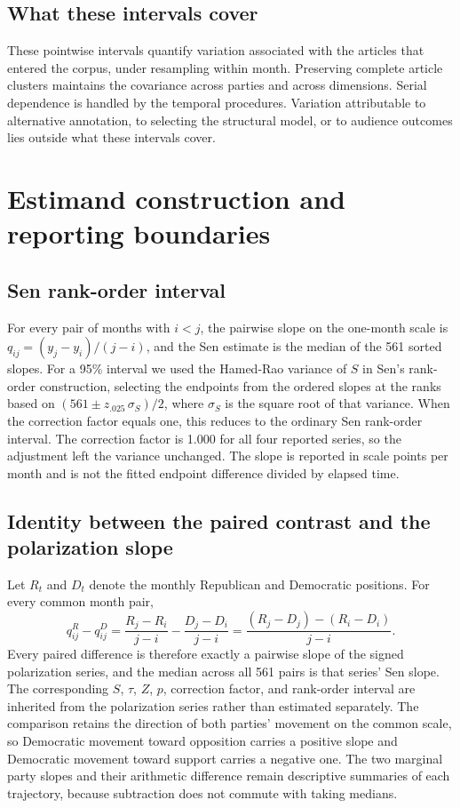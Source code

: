 \subsection*{What these intervals cover}

These pointwise intervals quantify variation associated with the articles that entered the corpus, under resampling within month. Preserving complete article clusters maintains the covariance across parties and across dimensions. Serial dependence is handled by the temporal procedures. Variation attributable to alternative annotation, to selecting the structural model, or to audience outcomes lies outside what these intervals cover.

\section{Estimand construction and reporting boundaries}

\subsection*{Sen rank-order interval}

For every pair of months with $i<j$, the pairwise slope on the one-month scale is $q_{ij}=(y_j-y_i)/(j-i)$, and the Sen estimate is the median of the 561 sorted slopes. For a 95\% interval we used the Hamed-Rao variance of $S$ in Sen's rank-order construction, selecting the endpoints from the ordered slopes at the ranks based on $(561 \pm z_{.025}\,\sigma_S)/2$, where $\sigma_S$ is the square root of that variance. When the correction factor equals one, this reduces to the ordinary Sen rank-order interval. The correction factor is 1.000 for all four reported series, so the adjustment left the variance unchanged. The slope is reported in scale points per month and is not the fitted endpoint difference divided by elapsed time.

\subsection*{Identity between the paired contrast and the polarization slope}

Let $R_t$ and $D_t$ denote the monthly Republican and Democratic positions. For every common month pair,
\[
q^{R}_{ij}-q^{D}_{ij}=\frac{R_j-R_i}{j-i}-\frac{D_j-D_i}{j-i}=\frac{(R_j-D_j)-(R_i-D_i)}{j-i}.
\]
Every paired difference is therefore exactly a pairwise slope of the signed polarization series, and the median across all 561 pairs is that series' Sen slope. The corresponding $S$, $\tau$, $Z$, $p$, correction factor, and rank-order interval are inherited from the polarization series rather than estimated separately. The comparison retains the direction of both parties' movement on the common scale, so Democratic movement toward opposition carries a positive slope and Democratic movement toward support carries a negative one. The two marginal party slopes and their arithmetic difference remain descriptive summaries of each trajectory, because subtraction does not commute with taking medians.

